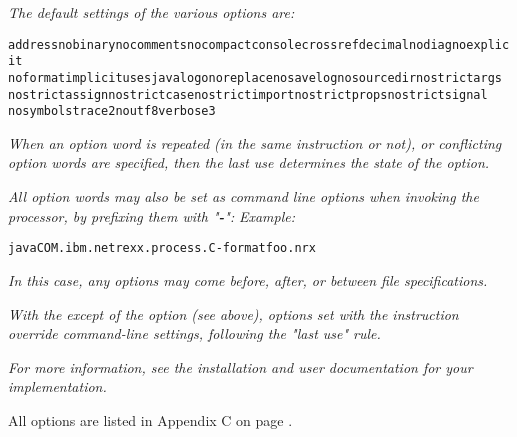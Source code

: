 \emph{The default settings of the various options are:}
\begin{alltt}
address nobinary nocomments nocompact console crossref decimal nodiag noexplicit
noformat implicituses java logo noreplace nosavelog nosourcedir nostrictargs
nostrictassign nostrictcase nostrictimport nostrictprops nostrictsignal
nosymbols trace2 noutf8 verbose3
\end{alltt}
 
\emph{When an option word is repeated (in the same 
instruction or not), or conflicting option words are specified, then the
last use determines the state of the option.}
 
\emph{All option words may also be set as command line options when invoking
the processor, by prefixing them with "\textbf{-}":}
 \emph{Example:}
\begin{alltt}
java COM.ibm.netrexx.process.\nr{}C -format foo.nrx
\end{alltt}
\emph{In this case, any options may come before, after, or between
file specifications.}
 
\emph{With the except of the  option (see above),
options set with the  instruction override command-line
settings, following the "last use" rule.}
 
\emph{For more information, see the installation and user documentation for
your implementation.
}

All options are listed in Appendix C on page \pageref{optionstable}.
